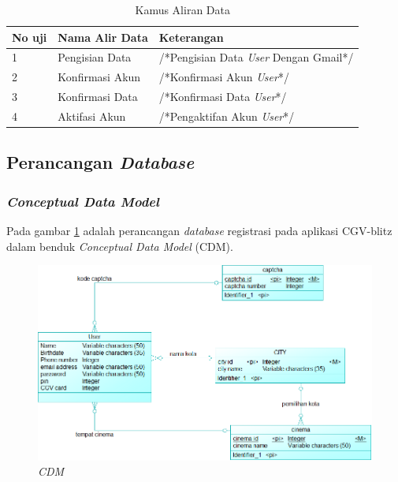 \begin{table}[!htbp]
\captionsetup{singlelinecheck=off}
\caption{Kamus Aliran Data}
\label{Kamus Aliran Data}
\begin{tabular}{|l|l|l|}
\hline
\textbf{No uji} & \textbf{Nama Alir Data} & \textbf{Keterangan}                  \\ \hline
1               & Pengisian Data          & /*Pengisian Data \textit{User} Dengan Gmail*/ \\ \hline

2               & Konfirmasi Akun               & /*Konfirmasi Akun \textit{User}*/             \\ \hline
3               & Konfirmasi Data               & /*Konfirmasi Data \textit{User}*/             \\ \hline

4               & Aktifasi Akun           & /*Pengaktifan Akun \textit{User}*/          \\ \hline
\end{tabular}
\end{table}
\subsection{Perancangan \textit{Database}}
\subsubsection{\textit{Conceptual Data Model}}
\par
Pada gambar \ref{cdm} adalah perancangan \textit{database} registrasi pada aplikasi CGV-blitz dalam benduk \textit{Conceptual Data Model} (CDM).


\begin{figure}[!htbp]
    \centering
    \includegraphics[scale=0.6]{gambar/CDM}
    \caption{\textit{CDM}}
    \label{cdm}
\end{figure}

